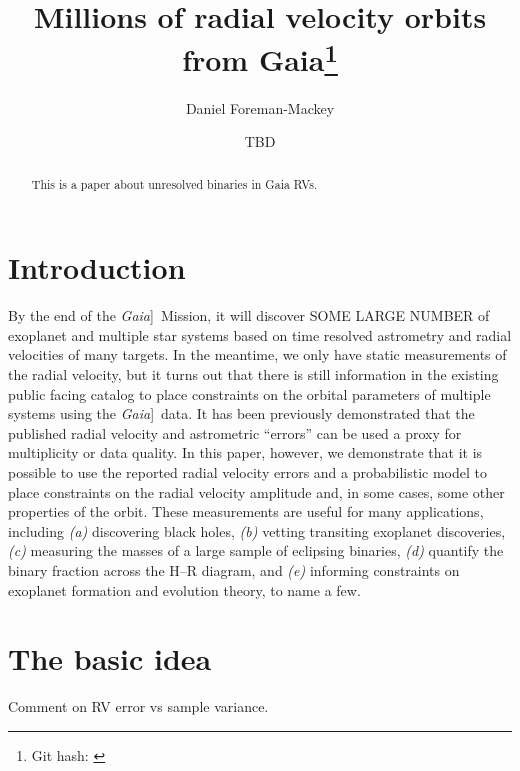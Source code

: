 \documentclass[modern, letterpaper]{aastex63}
\newcommand{\project}[1]{\textsl{#1}}
\newcommand{\Gaia}{\project{Gaia}]}
\begin{document}
\title{Millions of radial velocity orbits from Gaia\footnote{Git hash: \textsf{\githash}}}


\author[0000-0002-9328-5652]{Daniel Foreman-Mackey}

\author{TBD}
\noaffiliation{}

\begin{abstract}
  This is a paper about unresolved binaries in Gaia RVs.
\end{abstract}


\section{Introduction} \label{sec:intro}

By the end of the \Gaia\ Mission, it will discover SOME LARGE NUMBER of exoplanet and multiple star systems based on time resolved astrometry and radial velocities of many targets.
In the meantime, we only have static measurements of the radial velocity, but it turns out that there is still information in the existing public facing catalog to place constraints on the orbital parameters of multiple systems using the \Gaia\ data.
It has been previously demonstrated that the published radial velocity and astrometric ``errors'' can be used a proxy for multiplicity or data quality.
In this paper, however, we demonstrate that it is possible to use the reported radial velocity errors and a probabilistic model to place constraints on the radial velocity amplitude and, in some cases, some other properties of the orbit.
These measurements are useful for many applications, including \emph{(a)} discovering black holes, \emph{(b)} vetting transiting exoplanet discoveries, \emph{(c)} measuring the masses of a large sample of eclipsing binaries, \emph{(d)} quantify the binary fraction across the H--R diagram, and \emph{(e)} informing constraints on exoplanet formation and evolution theory, to name a few.


\section{The basic idea}

Comment on RV error vs sample variance.
\end{document}
